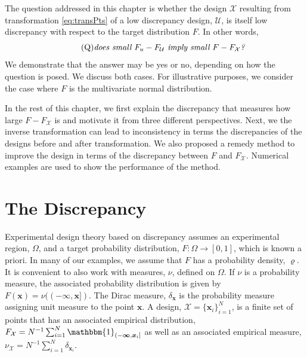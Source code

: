 \documentclass[graybox]{svmult}
\newcommand{\vx}{\boldsymbol{x}}
\newcommand{\vinfty}{\boldsymbol{\infty}}
\newcommand{\Udes}{\mathcal{U}}
\newcommand{\Xdes}{\mathcal{X}}
\newcommand{\Ftar}{F}
\newcommand{\ftar}{\varrho}
\newcommand{\bbone}{\mathbbm{1}}
\begin{document}
The question addressed in this chapter is whether the design $\Xdes$ resulting from transformation \eqref{eq:transPts} of a low discrepancy design, $\Udes$, is itself low discrepancy with respect to the target distribution $\Ftar$. 
In other words, 
\begin{equation} \label{BigQ} \tag{Q}
\text{\emph{does small $F_u - F_\Udes$ imply small $\Ftar - F_\Xdes$?}}
\end{equation}
We demonstrate that the answer may be yes or no, depending on how the question is posed.  
We discuss both cases.  
For illustrative purposes, we consider the case where $\Ftar$ is the multivariate normal distribution.

In the rest of this chapter, we first explain the discrepancy that measures how large $\Ftar - F_\Xdes$ is and motivate it from three different perspectives.  Next, we the inverse transformation can lead to inconsistency in terms the discrepancies of the designs before and after transformation. 
We also proposed a remedy method to improve the design in terms of the discrepancy between $\Ftar$ and $F_\Xdes$. 
Numerical examples are used to show the performance of the method. 

\section{The Discrepancy}

Experimental design theory based on  discrepancy assumes an experimental region, $\Omega$, and a target probability distribution, $\Ftar:\Omega \to [0,1]$, which is known a priori. In many of our examples, we assume that $\Ftar$ has a probability density, $\ftar$.  It is convenient to also work with measures, $\nu$, defined on $\Omega$.  If $\nu$ is a probability measure, the associated probability distribution is given by $F(\vx) = \nu((-\vinfty,\vx])$.  The Dirac measure, $\delta_{\vx}$ is the probability measure assigning unit measure to the point $\vx$.  A design, $\Xdes = \{\vx_i\}_{i=1}^N$, is a finite set of points that has an associated empirical distribution, $F_{\Xdes}  = N^{-1} \sum_{i=1}^N \bbone_{(-\vinfty,\vx_i]}$ as well as an associated empirical measure, $\nu_{\Xdes}  = N^{-1} \sum_{i=1}^N \delta_{\vx_i}$.
\end{document}
